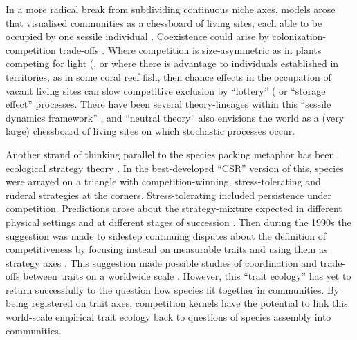 \documentclass[a4paper,11pt]{article}
\begin{document}
In a more radical break from subdividing continuous niche axes, models arose that
visualised communities as a chessboard of living sites, each able to be occupied by one sessile individual \citep{Yodzis-1978}. Coexistence could arise by colonization-competition trade-offs \citep{Levins-1969,Levins-1971}. Where competition is size-asymmetric as in plants competing for light (\citep{Harper-1977,Weiner-1990}, or where there is advantage to individuals established in territories, as in some coral reef fish, then chance effects in the occupation of vacant living sites can slow competitive exclusion by ``lottery'' \citep{Sale-1977}( or ``storage effect'' \citep{Chesson-1981} processes. There have been several theory-lineages within this ``sessile dynamics framework'' \citep{Fagerstrom-1997}, and ``neutral theory'' \citep{Hubbell-2001} also envisions the world as a (very large) chessboard of living sites on which stochastic processes occur.

Another strand of thinking parallel to the species packing metaphor has been ecological strategy theory 
\citep[e.g.][]{Grime-1974, Grime-1977, Grime-1979, Grime-1988, Southwood-1977, 
Greenslade-1983}. In the best-developed ``CSR'' version of this, species were arrayed on a triangle with competition-winning, stress-tolerating and ruderal strategies at the corners. Stress-tolerating included persistence under competition. Predictions arose about the strategy-mixture expected in different physical settings and at different stages of succession \citep{Grime-1979,Grime-2001}. Then during the 1990s the suggestion was made to sidestep continuing disputes about the definition of competitiveness by focusing instead on measurable traits and using them as strategy axes \citep{Westoby-1998, Weiher-1999, Westoby-2002}. This suggestion made possible studies of coordination and trade-offs between traits on a worldwide scale \citep[e.g.][]{Wright-2004, Zanne-2010, Cornwell-2014}. However, this ``trait ecology'' has yet to return successfully to the question how species fit together in communities. By being registered on trait axes, competition kernels have the potential to link this world-scale empirical trait ecology back to questions of species assembly into communities.
\end{document}
